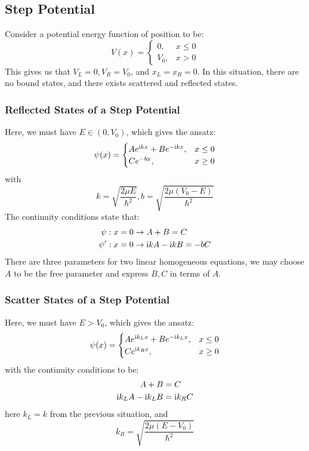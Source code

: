 \subsection{Step Potential}
Consider a potential energy function of position to be:
$$V(x) = \begin{cases}
    0, & x \le 0 \\
    V_0, & x > 0
\end{cases}$$
This gives us that $V_L = 0, V_R = V_0$, and $x_L = x_R = 0$. In this situation, there are no bound states, and there exists scattered and reflected states.

\subsubsection{Reflected States of a Step Potential}
Here, we must have $E \in (0, V_0)$, which gives the ansatz:
$$\psi(x) = \begin{cases}
    Ae^{\mathrm{i} k x} + Be^{-\mathrm{i} k x}, & x \le 0 \\
    Ce^{-bx}, & x \ge 0
\end{cases}$$
with
$$k = \sqrt{\frac{2\mu E}{\hbar^2}}, b = \sqrt{\frac{2\mu(V_0 - E)}{\hbar^2}}$$
The continuity conditions state that:
\begin{align*}
    \psi &: x = 0 \to A + B = C \\
    \psi'&: x = 0 \to \mathrm{i} k A - \mathrm{i} k B = -bC 
\end{align*}
There are three parameters for two linear homogeneous equations, we may choose $A$ to be the free parameter and express $B, C$ in terms of $A$.

\subsubsection{Scatter States of a Step Potential}
Here, we must have $E > V_0$, which gives the ansatz:
$$\psi(x) = \begin{cases}
    Ae^{\mathrm{i} k_L x} + Be^{-\mathrm{i} k_L x}, & x \le 0 \\
    Ce^{\mathrm{i} k_R x}, & x \ge 0
\end{cases}$$
with the continuity conditions to be:
\begin{align*}
    A + B &= C \\
    \mathrm{i} k_L A - \mathrm{i} k_L B &= \mathrm{i} k_R C
\end{align*}
here $k_L = k$ from the previous situation, and
$$k_R = \sqrt{\frac{2\mu(E-V_0)}{\hbar^2}}$$

